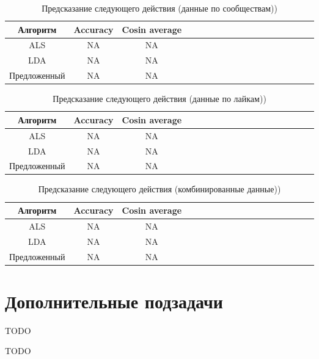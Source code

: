 \documentclass[times,specification,annotation]{itmo-student-thesis}
\begin{document}
\begin{table}[!h]
\caption{Предсказание следующего действия (данные по сообществам))}\label{tab2-subs}
\centering
\begin{tabular}{|*{18}{c|}}\hline
Алгоритм & Accuracy & Cosin average \\\hline
ALS  & NA & NA  \\\hline
LDA  & NA & NA \\\hline
Предложенный  & NA & NA \\\hline
\end{tabular}
\end{table}

\begin{table}[!h]
\caption{Предсказание следующего действия (данные по лайкам))}\label{tab2-likes}
\centering
\begin{tabular}{|*{18}{c|}}\hline
Алгоритм & Accuracy & Cosin average \\\hline
ALS  & NA & NA  \\\hline
LDA  & NA & NA \\\hline
Предложенный  & NA & NA \\\hline
\end{tabular}
\end{table}


\begin{table}[!h]
\caption{Предсказание следующего действия (комбинированные данные))}\label{tab2-combined}
\centering
\begin{tabular}{|*{18}{c|}}\hline
Алгоритм & Accuracy & Cosin average \\\hline
ALS  & NA & NA  \\\hline
LDA  & NA & NA \\\hline
Предложенный  & NA & NA \\\hline
\end{tabular}
\end{table}


\section{Дополнительные подзадачи}

TODO

\startconclusionpage

TODO

\printmainbibliography

\appendix
\end{document}
